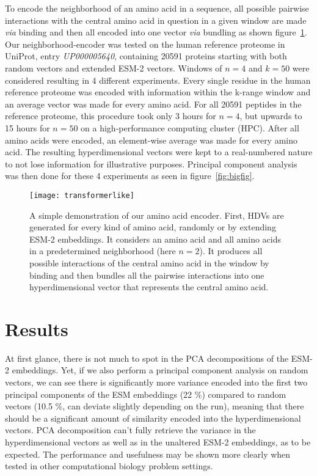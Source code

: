 To encode the neighborhood of an amino acid in a sequence, all possible pairwise interactions with the central amino acid in question in a given window are made \textit{via} binding and then all encoded into one vector \textit{via} bundling as shown figure~\ref{fig:AAtr}. Our neighborhood-encoder was tested on the human reference proteome in UniProt, entry \textit{UP000005640}, containing 20591 proteins starting with both random vectors and extended ESM-2 vectors. Windows of $n = 4$ and $k = 50$ were considered resulting in 4 different experiments. Every single residue in the human reference proteome was encoded with information within the k-range window and an average vector was made for every amino acid. For all 20591 peptides in the reference proteome, this procedure took only 3 hours for $n = 4$, but upwards to 15 hours for $n = 50$ on a high-performance computing cluster (HPC). After all amino acids were encoded, an element-wise average was made for every amino acid. The resulting hyperdimensional vectors were kept to a real-numbered nature to not lose information for illustrative purposes. Principal component analysis was then done for these 4 experiments as seen in figure~\ref{fig:bigfig}. 

\begin{figure}[H]
    \centering
    \texttt{[image: transformerlike]}
    \caption{A simple demonstration of our amino acid encoder. First, HDVs are generated for every kind of amino acid, randomly or by extending ESM-2 embeddings. It considers an amino acid and all amino acids in a predetermined neighborhood (here $n = 2$). It produces all possible interactions of the central amino acid in the window by binding and then bundles all the pairwise interactions into one hyperdimensional vector that represents the central amino acid.}
    \label{fig:AAtr}
\end{figure}


\section{Results}
At first glance, there is not much to spot in the PCA decompositions of the ESM-2 embeddings. Yet, if we also perform a principal component analysis on random vectors, we can see there is significantly more variance encoded into the first two principal components of the ESM embeddings (22 \%) compared to random vectors (10.5 \%, can deviate slightly depending on the run), meaning that there should be a significant amount of similarity encoded into the hyperdimensional vectors. PCA decomposition can't fully retrieve the variance in the hyperdimensional vectors as well as in the unaltered ESM-2 embeddings, as to be expected. The performance and usefulness may be shown more clearly when tested in other computational biology problem settings.


